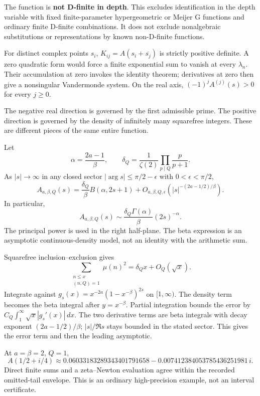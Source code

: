 \documentclass[11pt,oneside,openany]{book}
\newcommand{\dd}{\,d}
\newcommand{\A}{A_{a,\beta,Q}}
\begin{document}
The function is \textbf{not D-finite in depth}. This excludes identification
in the depth variable with fixed finite-parameter hypergeometric or Meijer
G functions and ordinary finite D-finite combinations. It does not exclude
nonalgebraic substitutions or representations by known non-D-finite functions.

For distinct complex points $s_i$, $K_{ij}=A(s_i+\overline{s_j})$ is strictly
positive definite. A zero quadratic form would force a finite exponential
sum to vanish at every $\lambda_n$. Their accumulation at zero invokes the
identity theorem; derivatives at zero then give a nonsingular Vandermonde
system. On the real axis, $(-1)^jA^{(j)}(s)>0$ for every $j\ge0$.

The negative real direction is governed by the first admissible prime. The
positive direction is governed by the density of infinitely many squarefree
integers. These are different pieces of the same entire function.

Let
\[
\alpha=\frac{2a-1}{\beta},\qquad
\delta_Q=\frac1{\zeta(2)}\prod_{p\mid Q}\frac{p}{p+1}.
\]
As $|s|\to\infty$ in any closed sector
$|\arg s|\le\pi/2-\epsilon$ with $0<\epsilon<\pi/2$,
\[
\boxed{\A(s)=\frac{\delta_Q}{\beta}B(\alpha,2s+1)
+O_{a,\beta,Q,\epsilon}\left(|s|^{-(2a-1/2)/\beta}\right).}
\]
In particular,
\[
\A(s)\sim\frac{\delta_Q\Gamma(\alpha)}{\beta}(2s)^{-\alpha}.
\]
The principal power is used in the right half-plane. The beta expression is
an asymptotic continuous-density model, not an identity with the arithmetic sum.

Squarefree inclusion--exclusion gives
\[
\sum_{\substack{n\le x\\(n,Q)=1}}\mu(n)^2
=\delta_Q x+O_Q(\sqrt{x}).
\]
Integrate against $g_s(x)=x^{-2a}(1-x^{-\beta})^{2s}$ on $[1,\infty)$.
The density term becomes the beta integral after $y=x^{-\beta}$. Partial
integration bounds the error by
$C_Q\int_1^\infty\sqrt{x}|g_s'(x)|\dd x$.
The two derivative terms are beta integrals with decay exponent
$(2a-1/2)/\beta$; $|s|/\Re s$ stays bounded in the stated sector.
This gives the error term and then the leading asymptotic.

At $a=\beta=2$, $Q=1$,
\[
A(1/2+i/4)\approx
0.06033183289343401791658
-0.007412384053785436251981\,i.
\]
Direct finite sums and a zeta--Newton evaluation agree within the recorded
omitted-tail envelope. This is an ordinary high-precision example, not an
interval certificate.
\end{document}
